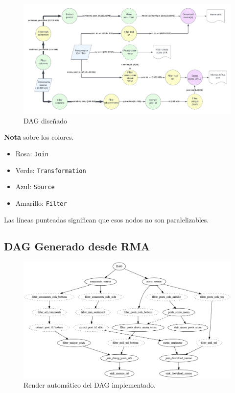 \documentclass[titlepage,a4paper,oneside]{article}
\begin{document}
\begin{figure}[H]
\centering
\includegraphics[width=\textwidth]{images/DAG.png}
\caption{DAG diseñado}
\end{figure}

\textbf{Nota} sobre los colores.
\begin{itemize}
	\item Rosa: \texttt{Join}
	\item Verde: \texttt{Transformation}
	\item Azul: \texttt{Source}
	\item Amarillo: \texttt{Filter}
\end{itemize}

Las líneas punteadas significan que esos nodos no son paralelizables.

\subsection{DAG Generado desde RMA}
\begin{figure}[H]
\centering
\includegraphics[width=\textwidth]{images/DAG.gv.png}
\caption{Render automático del DAG implementado.}
\end{figure}
\end{document}
